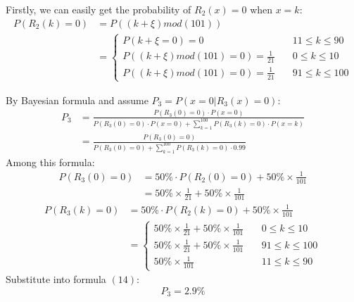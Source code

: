 \documentclass[a4paper,12pt]{article}
\begin{document}
Firstly, we can easily get the probability of $R_2(x) = 0$ when $x = k$:
\begin{equation}
    \begin{aligned}
        P(R_2(k) = 0) & = P((k + \xi)mod(101))                                              \\
                      & = \begin{cases}
                              P(k + \xi = 0) = 0                     & \quad 11\leq k \leq 90   \\
                              P((k + \xi)mod(101)= 0) = \frac{1}{21} & \quad 0 \leq k \leq 10   \\
                              P((k + \xi)mod(101)= 0) = \frac{1}{21} & \quad 91 \leq k \leq 100
                          \end{cases}
    \end{aligned}
\end{equation}

By Bayesian formula and assume $P_3 = P(x = 0 | R_3(x) = 0)$:
\begin{equation}
    \begin{aligned}
        P_3 & = \frac{P(R_3(0) = 0)\cdot P(x = 0)}{P(R_3(0) = 0)\cdot P(x = 0) + \sum\limits_{k = 1}^{100}P(R_3(k) = 0)\cdot P(x = k)} \\
            & = \frac{P(R_3(0) = 0)}{P(R_3(0) = 0) + \sum\limits_{k = 1}^{100}P(R_3(k) = 0)\cdot 0.99}
    \end{aligned}
\end{equation}
Among this formula:
\begin{equation}
    \begin{aligned}
        P(R_3(0) = 0) & = 50\% \cdot P(R_2(0) = 0) + 50\%\times \frac{1}{101}  \\
                      & = 50\% \times \frac{1}{21} + 50\% \times \frac{1}{101}
    \end{aligned}
\end{equation}
\begin{equation}
    \begin{aligned}
        P(R_3(k) = 0) & = 50\% \cdot P(R_2(k) = 0) + 50\%\times \frac{1}{101} \\
                      & =
        \begin{cases}
            50\% \times \frac{1}{21} + 50\% \times \frac{1}{101} & \quad 0 \leq k \leq 10   \\
            50\% \times \frac{1}{21} + 50\% \times \frac{1}{101} & \quad 91 \leq k \leq 100 \\
            50\% \times \frac{1}{101}                            & \quad 11 \leq k \leq 90
        \end{cases}
    \end{aligned}
\end{equation}
Substitute into formula $(14)$:
\begin{equation}
    P_3  = 2.9\%
\end{equation}
\end{document}
